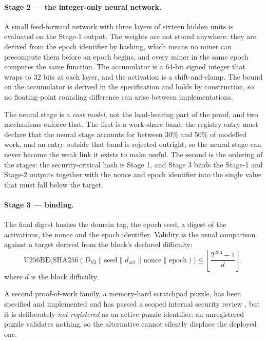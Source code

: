 \documentclass{article}
\begin{document}
\paragraph{Stage 2 --- the integer-only neural network.} A small feed-forward
network with three layers of sixteen hidden units is evaluated on the Stage-1
output. The weights are not stored anywhere: they are derived from the epoch
identifier by hashing, which means no miner can precompute them before an epoch
begins, and every miner in the same epoch computes the same function. The
accumulator is a 64-bit signed integer that wraps to 32 bits at each layer, and
the activation is a shift-and-clamp. The bound on the accumulator is derived in
the specification and holds by construction, so no floating-point rounding
difference can arise between implementations.

The neural stage is a \emph{cost model}, not the load-bearing part of the
proof, and two mechanisms enforce that. The first is a work-share band: the
registry entry must declare that the neural stage accounts for between 30\% and
50\% of modelled work, and an entry outside that band is rejected outright, so
the neural stage can never become the weak link it exists to make useful. The
second is the ordering of the stages: the security-critical hash is Stage 1,
and Stage 3 binds the Stage-1 and Stage-2 outputs together with the nonce and
epoch identifier into the single value that must fall below the target.

\paragraph{Stage 3 --- binding.} The final digest hashes the domain tag, the
epoch seed, a digest of the activations, the nonce and the epoch identifier.
Validity is the usual comparison against a target derived from the block's
declared difficulty:
\begin{equation}
\mathrm{U256BE}\big(\mathrm{SHA256}(D_{S3} \parallel \mathrm{seed} \parallel
d_{\mathrm{act}} \parallel \mathrm{nonce} \parallel \mathrm{epoch})\big)
\leq \left\lfloor \frac{2^{256}-1}{d} \right\rfloor ,
\label{eq:pow}
\end{equation}
where $d$ is the block difficulty.

A second proof-of-work family, a memory-hard scratchpad puzzle, has been
specified and implemented and has passed a scoped internal security review
\cite{jounit-hbm-review}, but it is deliberately \emph{not registered} as an
active puzzle identifier: an unregistered puzzle validates nothing, so the
alternative cannot silently displace the deployed one.
\end{document}
